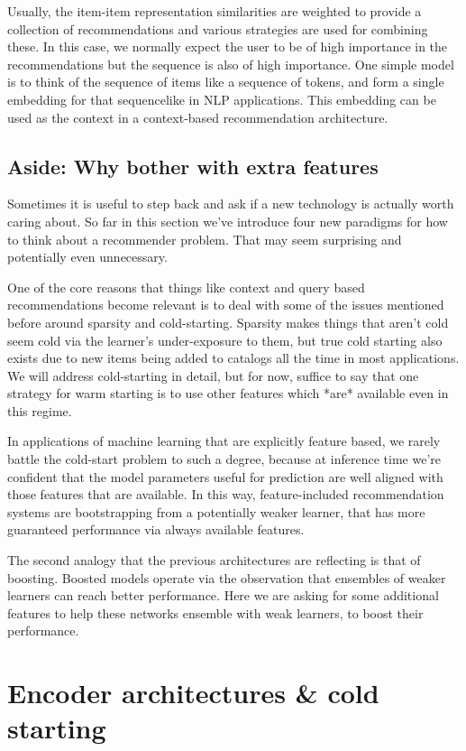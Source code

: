 Usually, the item-item representation similarities are weighted to provide a collection of recommendations and various strategies are used for combining these. In this case, we normally expect the user to be of high importance in the recommendations but the sequence is also of high importance. One simple model is to think of the sequence of items like a sequence of tokens, and form a single embedding for that sequence\textemdash like in NLP applications. This embedding can be used as the context in a context-based recommendation architecture.

\subsection{Aside: Why bother with extra features}

Sometimes it is useful to step back and ask if a new technology is actually worth caring about. So far in this section we've introduce four new paradigms for how to think about a recommender problem. That may seem surprising and potentially even unnecessary. 

One of the core reasons that things like context and query based recommendations become relevant is to deal with some of the issues mentioned before around sparsity and cold-starting. Sparsity makes things that aren't cold seem cold via the learner's under-exposure to them, but true cold starting also exists due to new items being added to catalogs all the time in most applications. We will address cold-starting in detail, but for now, suffice to say that one strategy for warm starting is to use other features which *are* available even in this regime.

In applications of machine learning that are explicitly feature based, we rarely battle the cold-start problem to such a degree, because at inference time we're confident that the model parameters useful for prediction are well aligned with those features that are available. In this way, feature-included recommendation systems are bootstrapping from a potentially weaker learner, that has more guaranteed performance via always available features. 

The second analogy that the previous architectures are reflecting is that of boosting. Boosted models operate via the observation that ensembles of weaker learners can reach better performance. Here we are asking for some additional features to help these networks ensemble with weak learners, to boost their performance. 

\section{Encoder architectures \& cold starting}

